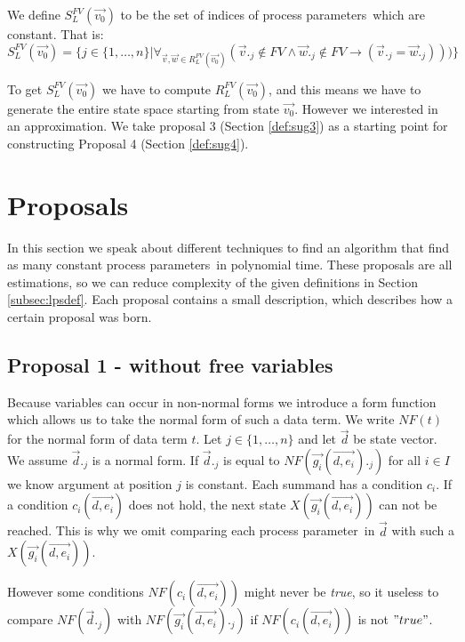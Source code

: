 \index{}\documentclass[a4paper,10pt]{article}
\theoremstyle{plain}
\theoremstyle{definition}
\newcommand{\ovr}{\overrightarrow}
\newcommand{\pp}{process parameter}
\newcommand{\pps}{process parameters}
\newcommand{\ti}{\textit}
\begin{document}
\begin{defn}\label{def:lps_comp_fv} We define $S_L^{FV}(\ovr{v_0})$ to be the set of indices of \pps\ which are constant. That is:\\

$S_L^{FV}(\ovr{v_0}) = \lbrace j \in  \lbrace 1, \ldots, n \rbrace \vert \forall_{\ovr{v}, \ovr{w} \in R_L^{FV}(\ovr{v_0})}( \ovr{v}._j \not\in FV \wedge \ovr{w}._j \not\in FV \rightarrow ( \ovr{v}._j = \ovr{w}._j)))
\rbrace $
\end{defn}

To get $S_L^{FV} (\ovr{v_0})$ we have to compute $R_L^{FV}(\ovr{v_0})$, and this means we have to generate the entire state space starting from state $\ovr{v_0}$. However we interested in an approximation. We take proposal 3 (Section \ref{def:sug3}) as a starting point for constructing Proposal 4 (Section \ref{def:sug4}).

\section{Proposals}
In this section we speak about different techniques to find an algorithm that find as many constant \pps\ in polynomial time. These proposals are all estimations, so we can reduce complexity of the given definitions in Section \ref{subsec:lpsdef}. Each proposal contains a small description, which describes how a certain proposal was born. 

\subsection{Proposal 1 - without free variables} \label{sec:prop1}
Because variables can occur in non-normal forms we introduce a form function which allows us to take the normal form of such a data term. 
We write $NF(t)$ for the normal form of data term $t$. 
Let $j \in \lbrace 1, \ldots,  n \rbrace $ and let $\ovr{d}$ be state vector. We assume $\ovr{d}._j$ is a normal form. If $\ovr{d}._j$ is equal to $NF(\ovr{g_i}(\ovr{d,e_i})._j)$ for all $i \in I$ we know argument at position $j$ is constant. Each summand has a condition $c_i$. If a condition $c_i(\ovr{d, e_i})$ does not hold, the next state $X(\ovr{g_i}(\ovr{d, e_i}))$ can not be reached. This is why we omit comparing each \pp\ in $\ovr{d} $ with such a $X(\ovr{g_i}(\ovr{d, e_i}))$.

 However some conditions $NF(c_i(\ovr{d,e_i}))$ might never be \ti{true}, so it useless to compare $NF(\ovr{d}._j)$ with $NF(\ovr{g_i}(\ovr{d,e_i})._j)$  if $NF(c_i(\ovr{d,e_i}))$ is not  $"true"$. \\
\end{document}
